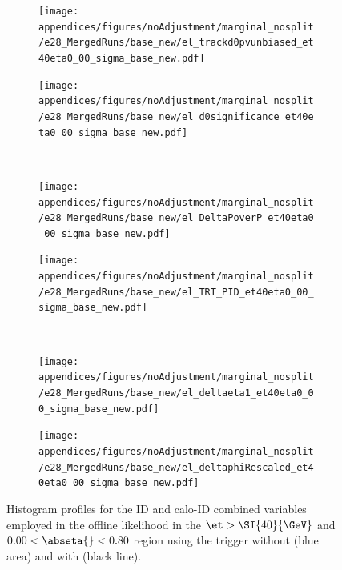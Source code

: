\begin{figure}[b]
\begin{center}
\begin{subfigure}[c]{.48\textwidth}
\centering
\texttt{[image: appendices/figures/noAdjustment/marginal\_nosplit/e28\_MergedRuns/base\_new/el\_trackd0pvunbiased\_et40eta0\_00\_sigma\_base\_new.pdf]}
\caption{}%
\label{fig:gof_d0}
\end{subfigure}
\hfill
\begin{subfigure}[c]{.48\textwidth}
\centering
\texttt{[image: appendices/figures/noAdjustment/marginal\_nosplit/e28\_MergedRuns/base\_new/el\_d0significance\_et40eta0\_00\_sigma\_base\_new.pdf]}
\caption{}%
\label{fig:gof_d0sig}
\end{subfigure} \\
\begin{subfigure}[c]{.48\textwidth}
\centering
\texttt{[image: appendices/figures/noAdjustment/marginal\_nosplit/e28\_MergedRuns/base\_new/el\_DeltaPoverP\_et40eta0\_00\_sigma\_base\_new.pdf]}
\caption{}%
\label{fig:gof_poverp}
\end{subfigure}
\hfill
\begin{subfigure}[c]{.48\textwidth}
\centering
\texttt{[image: appendices/figures/noAdjustment/marginal\_nosplit/e28\_MergedRuns/base\_new/el\_TRT\_PID\_et40eta0\_00\_sigma\_base\_new.pdf]}
\caption{}%
\label{fig:gof_TRT_PID}
\end{subfigure} \\
\end{center}
\end{figure}%
\begin{figure}[t]\ContinuedFloat\addtocounter{figure}{-1}
\begin{center}
\begin{subfigure}[c]{.48\textwidth}
\centering
\texttt{[image: appendices/figures/noAdjustment/marginal\_nosplit/e28\_MergedRuns/base\_new/el\_deltaeta1\_et40eta0\_00\_sigma\_base\_new.pdf]}
\caption{}%
\label{fig:gof_deltaeta1}
\end{subfigure}
\begin{subfigure}[c]{.48\textwidth}
\centering
\texttt{[image: appendices/figures/noAdjustment/marginal\_nosplit/e28\_MergedRuns/base\_new/el\_deltaphiRescaled\_et40eta0\_00\_sigma\_base\_new.pdf]}
\caption{}%
\label{fig:gof_deltaphi}
\end{subfigure}
\caption{%
Histogram profiles for the ID and calo-ID combined variables employed in
the offline likelihood in the $\et>\SI{40}{\GeV}$ and $0.00<\abseta{}<0.80$
region using the trigger without \rnn{} (blue area) and with \rnn{}
(black line).
}%
\label{fig:gof_track}
\end{center}
\end{figure}

